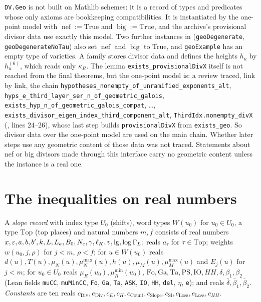 \begin{remark}\label{geoa:rem-hollow-geo}
\texttt{DV.Geo} is not built on Mathlib schemes: it is a record of types and predicates
whose only axioms are bookkeeping compatibilities. It is instantiated by the one-point
model with $\operatorname{nef}:=\text{True}$ and $\operatorname{big}:=\text{True}$, and
the archive's provisional divisor data use exactly this model. Two further instances in
(\texttt{geoDegenerate}, \texttt{geoDegenerateNoTau}) also set $\operatorname{nef}$ and
$\operatorname{big}$ to True, and \texttt{geoExample} has an empty type of varieties.
A family stores divisor data and defines the heights $h_u$ by $h^{(6)}_u$, which reads
only $\kappa_R$. The lemma \texttt{exists\_provisionalDivX} itself is not reached from the final
theorems, but the one-point model is: a review traced, link by link, the chain
\texttt{hypotheses\_nonempty\_of\_unramified\_exponents\_alt},
\texttt{hyps\_e\_third\_layer\_ser\_n\_of\_geometric\_galois},
\texttt{exists\_hyp\_n\_of\_geometric\_galois\_compat}, \dots,
\texttt{exists\_divisor\_eigen\_index\_third\_component\_alt},
\texttt{ThirdIdx.nonempty\_divX}
(, lines 24--26), whose last
step builds \texttt{provisionalDivX} from \texttt{exists\_geo}. So divisor data over
the one-point model are used on the main chain. Whether later steps use any geometric
content of those data was not traced. Statements about nef or big divisors made through this interface carry no
geometric content unless the instance is a real one.
\end{remark}

\section{The inequalities on real numbers}

\begin{definition}\label{geoa:record}
A \emph{slope record} with index type $U_0$ (shifts), word types $W(u_0)$ for
$u_0\in U_0$, a type $\mathrm{Top}$ (top places) and natural numbers $m,f$ consists of
real numbers $x,\varepsilon,a,b,b',k,L,L_a,B_0,N_c,\gamma,\ell_K,v,\lg,\log\Gamma_L$; reals
$a_{\tau}$ for $\tau\in\mathrm{Top}$; weights $w(u_0,j,\rho)$ for $j<m$, $\rho<f$; for
$u\in W(u_0)$ reals $d(u),T(u),\mu_N(u),\mu_N^{\max}(u),h(u),\mu_M(u),\mu_M^{\max}(u)$
and $E_j(u)$ for $j<m$; for $u_0\in U_0$ reals $\mu_R(u_0),\mu_R^{\min}(u_0)$,
$\mathrm{Fo},\mathrm{Ga},\mathrm{Ta},\mathrm{PS},\mathrm{IO},HH,\delta,\beta_1,\beta_2$
(Lean fields \texttt{muCC}, \texttt{muMinCC}, \texttt{Fo}, \texttt{Ga}, \texttt{Ta},
\texttt{ASK}, \texttt{IO}, \texttt{HH}, \texttt{del}, \texttt{$\eta$}, \texttt{e}); and reals
$\bar\delta,\bar\beta_1,\bar\beta_2$. \emph{Constants} are ten reals
$c_{\mathrm{Div}},e_{\mathrm{Div}},c_E,c_H,c_{\mathrm{Count}},c_{\mathrm{Slope}},
c_{\mathrm{Sl}},c_{\mathrm{Loss}},e_{\mathrm{Loss}},c_{HH}$.
\end{definition}

